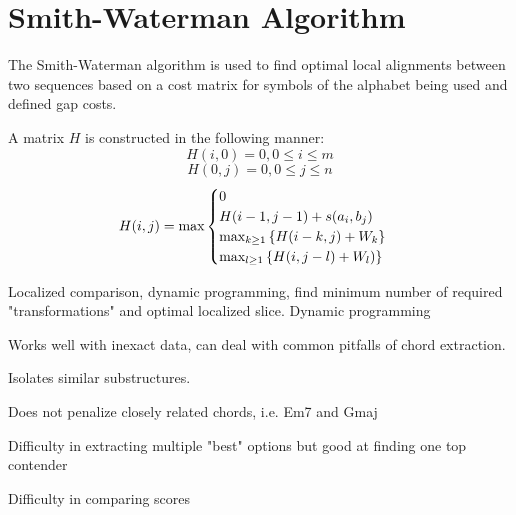 
\section{Smith-Waterman Algorithm}

The Smith-Waterman algorithm is used to find optimal local alignments between two sequences based on a cost matrix for symbols of the alphabet being used and defined gap costs.

A matrix $H$ is constructed in the following manner:
\[ H(i,0) = 0, 0 \leq i \leq m \]
\[ H(0,j) = 0, 0 \leq j \leq n \]
\[ H(i,j) = \hbox{max} \begin{cases} 0 \\ H(i-1,j-1)+s(a_i,b_j) \\ \hbox{max}_{k \geq 1} \left\{ H(i-k,j)+W_k \right\} \\ \hbox{max}_{l \geq 1}\left\{ H(i, j-l)+W_l) \right\} \end{cases}  \]

\item Localized comparison, dynamic programming, find minimum number of required "transformations" and optimal localized slice. Dynamic programming

\item Works well with inexact data, can deal with common pitfalls of chord extraction.

\item Isolates similar substructures.

\item Does not penalize closely related chords, i.e. Em7 and Gmaj

\item Difficulty in extracting multiple "best" options but good at finding one top contender

\item Difficulty in comparing scores